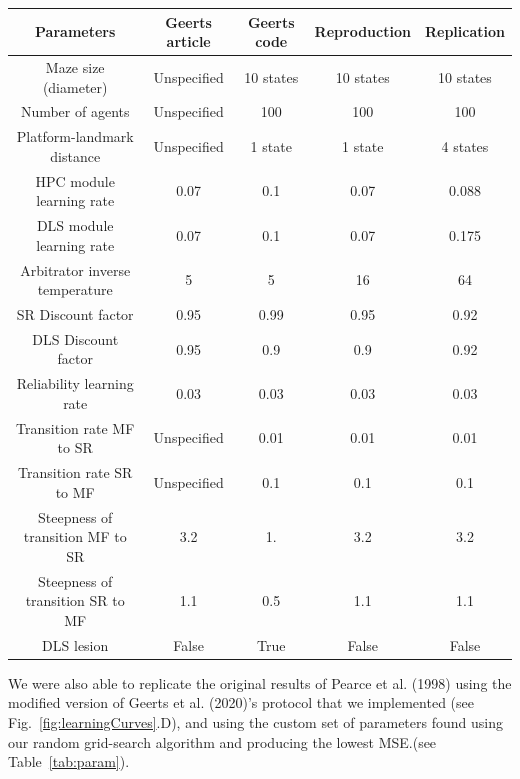 \begin{center}
\hspace*{-1cm}
\begin{tabular}{ |c|c|c|c|c| }

\hline
Parameters & Geerts article & Geerts code & Reproduction & Replication \\ [0.5ex] 
\hline\hline
Maze size (diameter) & Unspecified  & 10 states & 10 states  & 10 states\\ 
Number of agents & Unspecified & 100 & 100 & 100\\ 
Platform-landmark distance & Unspecified & 1 state & 1 state & 4 states\\ 
HPC module learning rate & 0.07 & 0.1 & 0.07 & 0.088\\
DLS module learning rate & 0.07 & 0.1 & 0.07 & 0.175\\
Arbitrator inverse temperature & 5 & 5 & 16 & 64\\
SR Discount factor & 0.95 & 0.99 & 0.95 & 0.92 \\
DLS Discount factor & 0.95 & 0.9 & 0.9 & 0.92 \\
Reliability learning rate & 0.03 & 0.03 & 0.03 & 0.03 \\
Transition rate MF to SR & Unspecified & 0.01 & 0.01 & 0.01 \\
Transition rate SR to MF & Unspecified & 0.1 & 0.1 & 0.1\\
Steepness of transition MF to SR & 3.2 & 1. & 3.2 & 3.2\\
Steepness of transition SR to MF & 1.1 & 0.5 & 1.1 & 1.1\\
DLS lesion & False & True & False & False\\
\hline

\end{tabular}
\label{tab:param}
\end{center}

We were also able to replicate the original results of Pearce et al. (1998) \cite{Pearce:1998} using the modified version of Geerts et al. (2020)'s protocol that we implemented (see Fig.~\ref{fig:learningCurves}.D), and using the custom set of parameters found using our random grid-search algorithm and producing the lowest MSE.(see Table~\ref{tab:param}).

